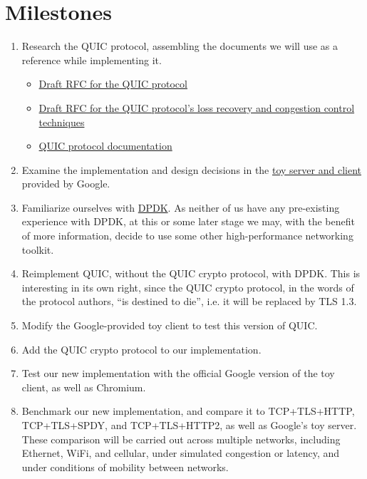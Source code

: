 \documentclass{article}
\begin{document}
\section{Milestones}

\begin{enumerate}
\item Research the QUIC protocol, assembling the documents we will use as a reference while implementing it.
  \begin{itemize}
  \item 
    \href{https://tools.ietf.org/html/draft-tsvwg-quic-protocol-02}{Draft RFC for the QUIC protocol}
  \item 
    \href{https://tools.ietf.org/html/draft-quic-loss-recovery}{Draft RFC for the QUIC protocol's loss recovery and congestion control techniques}
  \item 
    \href{https://docs.google.com/document/d/1g5nIXAIkN_Y-7XJW5K45IblHd_L2f5LTaDUDwvZ5L6g/}{QUIC protocol documentation}
  \end{itemize}
\item
  Examine the implementation and design decisions in the 
  \href{https://chromium.googlesource.com/chromium/src/+/master/net/tools/quic/}{toy server and client} 
  provided by Google.
\item 
  Familiarize ourselves with \href{http://dpdk.org/doc}{DPDK}.
  As neither of us have any pre-existing experience with DPDK,
  at this or some later stage we may, with the benefit of more information, decide to use some other high-performance networking toolkit.
\item 
  Reimplement QUIC, without the QUIC crypto protocol, with DPDK.
  This is interesting in its own right,
  since the QUIC crypto protocol, in the words of the protocol authors, ``is destined to die'', i.e. it will be replaced by TLS 1.3.
\item 
  Modify the Google-provided toy client to test this version of QUIC.
\item 
  Add the QUIC crypto protocol to our implementation.
\item 
  Test our new implementation with the official Google version of the toy client, as well as Chromium.
\item 
  Benchmark our new implementation, and compare it to TCP+TLS+HTTP, TCP+TLS+SPDY, and TCP+TLS+HTTP2, as well as Google's toy server.
  These comparison will be carried out across multiple networks, including Ethernet, WiFi, and cellular,
  under simulated congestion or latency,
  and under conditions of mobility between networks.
\end{enumerate}
\end{document}
